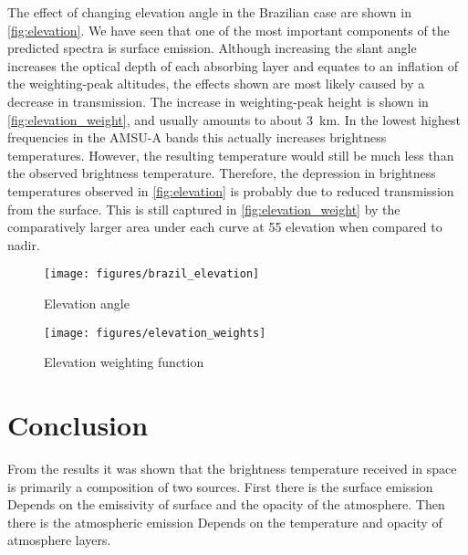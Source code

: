 \documentclass[twocol]{ametsoc}
\begin{document}
The effect of changing elevation angle in the Brazilian case are shown in \autoref{fig:elevation}.
We have seen that one of the most important components of the predicted spectra is surface emission.
Although increasing the slant angle increases the optical depth of each absorbing layer and equates to an inflation of the weighting-peak altitudes, the effects shown are most likely caused by a decrease in transmission.
The increase in weighting-peak height is shown in \autoref{fig:elevation_weight}, and usually amounts to about 3~km.
In the lowest highest frequencies in the AMSU-A bands this actually increases brightness temperatures.
However, the resulting temperature would still be much less than the observed brightness temperature.
Therefore, the depression in brightness temperatures observed in \autoref{fig:elevation} is probably due to reduced transmission from the surface.
This is still captured in \autoref{fig:elevation_weight} by the comparatively larger area under each curve at 55\degree{} elevation when compared to nadir.

\begin{figure}
	\centering
	\texttt{[image: figures/brazil\_elevation]}
	\caption{Elevation angle}
	\label{fig:elevation}
\end{figure}

\begin{figure}
	\centering
	\texttt{[image: figures/elevation\_weights]}
	\caption{Elevation weighting function}
	\label{fig:elevation_weight}
\end{figure}

\section{Conclusion}

From the results it was shown that the brightness temperature received in space is primarily a composition of two sources.
First there is the surface emission
Depends on the emissivity of surface and the opacity of the atmosphere.
Then there is the atmospheric emission
Depends on the temperature and opacity of atmosphere layers.


 
 
\end{document}
